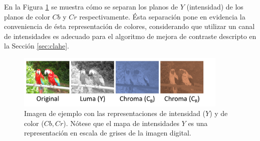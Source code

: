 En la Figura \ref{fig:ejemploycbcr} se muestra cómo se separan los planos de $Y$ (intensidad) de los planos de color $Cb$ y $Cr$ respectivamente. Ésta separación pone en evidencia la conveniencia de ésta representación de colores, considerando que utilizar un canal de intensidades es adecuado para el algoritmo de mejora de contraste descripto en la Sección \ref{sec:clahe}.
\fboxrule=2pt
\begin{figure}[H]
\centering
    \includegraphics[width=0.90\textwidth, frame]{./Figures/IC676791.png}
\caption{Imagen de ejemplo con las representaciones de intensidad ($Y$) y de color ($Cb,Cr$). Nótese que el mapa de intensidades $Y$ es una representación en escala de grises de la imagen digital.}\label{fig:ejemploycbcr}
\end{figure}




